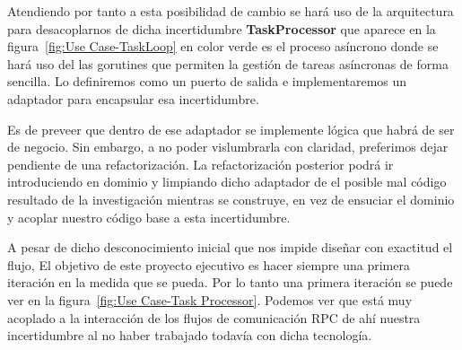 \begin{itemize}
    Atendiendo por tanto a esta posibilidad de cambio se hará uso de la arquitectura para desacoplarnos de dicha incertidumbre \textbf{TaskProcessor} que aparece en la figura~\cref{fig:Use Case-TaskLoop} en color verde es el proceso asíncrono donde se hará uso del las gorutines que permiten la gestión de tareas asíncronas de forma sencilla.
    Lo definiremos como un puerto de salida e implementaremos un adaptador para encapsular esa incertidumbre.

    Es de preveer que dentro de ese adaptador se implemente lógica que habrá de ser de negocio.
    Sin embargo, a no poder vislumbrarla con claridad, preferimos dejar pendiente de una refactorización.
    La refactorización posterior podrá ir introduciendo en dominio y limpiando dicho adaptador de el posible mal código resultado de la investigación mientras se construye, en vez de ensuciar el dominio y acoplar nuestro código base a esta incertidumbre.

    A pesar de dicho desconocimiento inicial que nos impide diseñar con exactitud el flujo, El objetivo de este proyecto ejecutivo es hacer siempre una primera iteración en la medida que se pueda.
    Por lo tanto una primera iteración se puede ver en la figura~\cref{fig:Use Case-Task Processor}.
    Podemos ver que está muy acoplado a la interacción de los flujos de comunicación RPC de ahí nuestra incertidumbre al no haber trabajado todavía con dicha tecnología.


\end{itemize}
